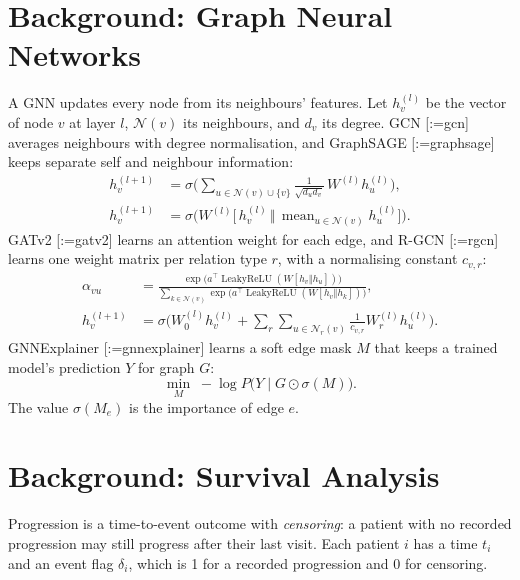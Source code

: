 \documentclass{mnnit}
\makeatletter
\newcommand{\rc}[1]{[\def\rc@sep{}\@for\rc@key:=#1\do{\rc@sep\ref{ref:\rc@key}\def\rc@sep{, }}]}
\makeatother
\begin{document}
\section{Background: Graph Neural Networks}
A GNN updates every node from its neighbours' features. Let $h_v^{(l)}$ be the vector of node $v$ at layer $l$,
$\mathcal{N}(v)$ its neighbours, and $d_v$ its degree. GCN \rc{gcn} averages neighbours with degree normalisation, and
GraphSAGE \rc{graphsage} keeps separate self and neighbour information:
\begin{align}
  h_v^{(l+1)} &= \sigma\Big(\sum_{u\in\mathcal{N}(v)\cup\{v\}} \frac{1}{\sqrt{d_u d_v}}\, W^{(l)} h_u^{(l)}\Big), \\
  h_v^{(l+1)} &= \sigma\Big(W^{(l)}\big[\,h_v^{(l)} \,\Vert\, \operatorname{mean}_{u\in\mathcal{N}(v)} h_u^{(l)}\big]\Big).
\end{align}
GATv2 \rc{gatv2} learns an attention weight for each edge, and R-GCN \rc{rgcn} learns one weight matrix per relation
type $r$, with a normalising constant $c_{v,r}$:
\begin{align}
  \alpha_{vu} &= \frac{\exp\big(a^\top \operatorname{LeakyReLU}(W[h_v\Vert h_u])\big)}{\sum_{k\in\mathcal{N}(v)}\exp\big(a^\top \operatorname{LeakyReLU}(W[h_v\Vert h_k])\big)}, \\
  h_v^{(l+1)} &= \sigma\Big(W_0^{(l)}h_v^{(l)}+\sum_{r}\sum_{u\in\mathcal{N}_r(v)}\frac{1}{c_{v,r}}W_r^{(l)}h_u^{(l)}\Big).
\end{align}
GNNExplainer \rc{gnnexplainer} learns a soft edge mask $M$ that keeps a trained model's prediction $Y$ for graph $G$:
\begin{equation}
  \min_M\; -\log P\big(Y\mid G\odot\sigma(M)\big).
\end{equation}
The value $\sigma(M_e)$ is the importance of edge $e$.

\section{Background: Survival Analysis}
Progression is a time-to-event outcome with \emph{censoring}: a patient with no recorded progression may still
progress after their last visit. Each patient $i$ has a time $t_i$ and an event flag $\delta_i$, which is 1 for a
recorded progression and 0 for censoring.
\end{document}
